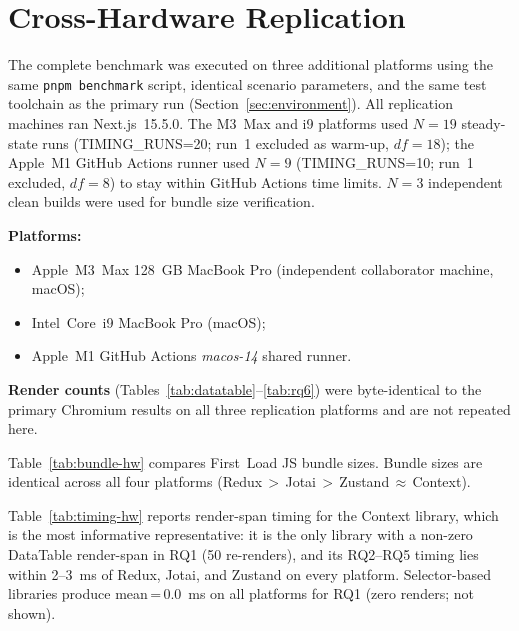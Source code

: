 \documentclass[conference]{IEEEtran}
\newcommand{\code}[1]{\texttt{\small #1}}
\begin{document}
\section{Cross-Hardware Replication}
\label{app:crosshw}

The complete benchmark was executed on three additional platforms using
the same \code{pnpm benchmark} script, identical scenario parameters,
and the same test toolchain as the primary run
(Section~\ref{sec:environment}).  All replication machines ran
Next.js~15.5.0.  The M3~Max and i9 platforms used $N{=}19$ steady-state
runs (TIMING\_RUNS=20; run~1 excluded as warm-up, $df{=}18$); the
Apple~M1 GitHub Actions runner used $N{=}9$ (TIMING\_RUNS=10;
run~1 excluded, $df{=}8$) to stay within GitHub Actions time limits.
$N{=}3$ independent clean builds were used for bundle size verification.

\textbf{Platforms:}
\begin{itemize}
  \item Apple~M3~Max 128~GB MacBook Pro (independent collaborator
    machine, macOS);
  \item Intel~Core~i9 MacBook Pro (macOS);
  \item Apple~M1 GitHub Actions \textit{macos-14} shared runner.
\end{itemize}

\textbf{Render counts} (Tables~\ref{tab:datatable}--\ref{tab:rq6}) were
byte-identical to the primary Chromium results on all three replication
platforms and are not repeated here.

Table~\ref{tab:bundle-hw} compares First~Load JS bundle sizes.
Bundle sizes are identical across all four platforms
(Redux\,$>$\,Jotai\,$>$\,Zustand\,$\approx$\,Context).

Table~\ref{tab:timing-hw} reports render-span timing for the Context
library, which is the most informative representative: it is the only
library with a non-zero DataTable render-span in RQ1 (50 re-renders),
and its RQ2--RQ5 timing lies within 2--3~ms of Redux, Jotai, and
Zustand on every platform.  Selector-based libraries produce
mean\,=\,0.0~ms on all platforms for RQ1 (zero renders; not shown).
\end{document}

